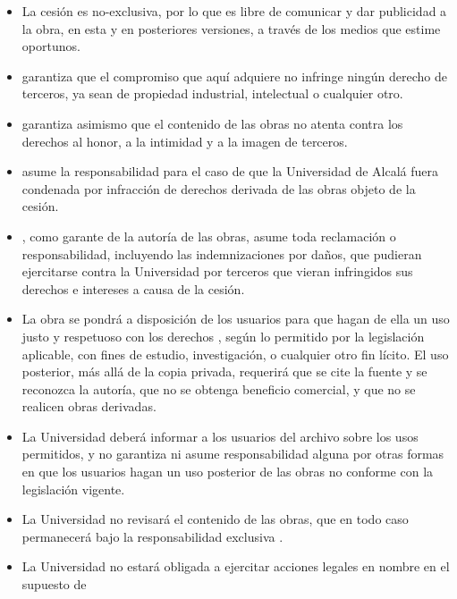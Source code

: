 \documentclass[12pt,a4paper,oneside]{article}
\begin{document}
\begin{itemize}
\item La cesión es no-exclusiva, por lo que \wordAutorElOrLa{}
  \wordAutorOrAutora{} es libre de comunicar y dar publicidad a la
  obra, en esta y en posteriores versiones, a través de los medios que
  estime oportunos.
\item \expandafter\makefirstuc\expandafter{\wordAutorElOrLa}
  \wordAutorOrAutora{} garantiza que el compromiso que aquí adquiere
  no infringe ningún derecho de terceros, ya sean de propiedad
  industrial, intelectual o cualquier otro.
\item \expandafter\makefirstuc\expandafter{\wordAutorElOrLa}
  \wordAutorOrAutora{}  garantiza asimismo que el contenido de las obras no atenta contra los derechos
  al honor, a la intimidad y a la imagen de terceros.
\item \expandafter\makefirstuc\expandafter{\wordAutorElOrLa}
  \wordAutorOrAutora{} asume la responsabilidad para el caso de que la Universidad de Alcalá fuera
  condenada por infracción de derechos derivada de las obras objeto de la cesión.
\item \expandafter\makefirstuc\expandafter{\wordAutorElOrLa}
  \wordAutorOrAutora{}, como garante de la autoría de las obras, asume toda reclamación o
  responsabilidad, incluyendo las indemnizaciones por daños, que pudieran ejercitarse
  contra la Universidad por terceros que vieran infringidos sus derechos e intereses a causa
  de la cesión.
\item La obra se pondrá a disposición de los usuarios para que hagan de
  ella un uso justo y respetuoso con los derechos \wordAutorDelOrDeLa{}
  \wordAutorOrAutora{}, según lo permitido por la legislación
  aplicable, con fines de estudio, investigación, o cualquier otro fin
  lícito. El uso posterior, más allá de la copia privada, requerirá que
  se cite la fuente y se reconozca la autoría, que no se obtenga
  beneficio comercial, y que no se realicen obras derivadas.
\item La Universidad deberá informar a los usuarios del archivo sobre los usos permitidos, y no
  garantiza ni asume responsabilidad alguna por otras formas en que los usuarios hagan un
  uso posterior de las obras no conforme con la legislación vigente.
\item La Universidad no revisará el contenido de las obras, que en todo
  caso permanecerá bajo la responsabilidad exclusiva \wordAutorDelOrDeLa{}
  \wordAutorOrAutora{}.
\item La Universidad no estará obligada a ejercitar acciones legales en
  nombre \wordAutorDelOrDeLa{} \wordAutorOrAutora{} en el supuesto de

\end{itemize}
\end{document}
